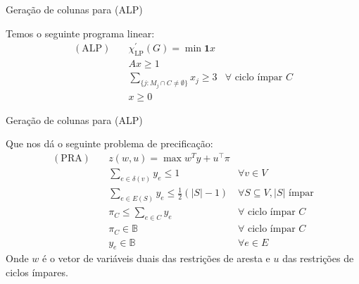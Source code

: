 \documentclass{beamer}
\begin{document}
    \begin{frame}{Geração de colunas para (ALP)}

        Temos o seguinte programa linear:
        {\color{blue}
        \begin{align*}
            (\mathrm{ALP})\quad&\chi^\prime_\mathrm{LP}(G) = \min \mathbf{1} x\\
            &A x \geq 1\\
            &\sum_{\{j \colon M_j \cap C \neq \emptyset\}} x_j \geq 3
            &\forall \text{ ciclo ímpar } C\\
            &x \geq 0
        \end{align*}}
    \end{frame}

    \begin{frame}{Geração de colunas para (ALP)}

        Que nos dá o seguinte problema de precificação:
        {\color{blue}
        \begin{align*}
            (\mathrm{PRA})\quad&z(w, u) = \max w^T y + u^\top \pi\\
            &\sum_{e \in \delta(v)} y_e \leq 1 &\forall v \in V\\
            &\sum_{e \in E(S)} y_e \leq \frac{1}{2}(|S| - 1) &\forall S \subseteq V, |S|\text{ ímpar}\\
            &\pi_C \leq \sum_{e \in C} y_e&\forall\text{ ciclo ímpar }C\\
            &\pi_C \in \mathbb{B}&\forall\text{ ciclo ímpar }C\\
            &y_e \in \mathbb{B}&\forall e \in E
        \end{align*}}
        Onde {\color{blue} $w$} é o vetor de variáveis duais das restrições de aresta e {\color{blue} $u$} das restrições de ciclos ímpares.
    \end{frame}
\end{document}
